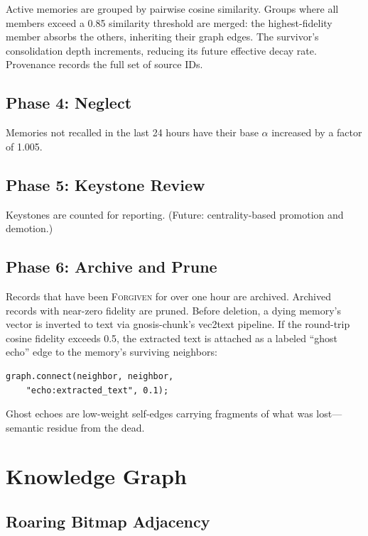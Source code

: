 \documentclass[twocolumn,10pt]{article}
\begin{document}
Active memories are grouped by pairwise cosine similarity.  Groups
where all members exceed a 0.85 similarity threshold are merged: the
highest-fidelity member absorbs the others, inheriting their graph
edges.  The survivor's consolidation depth increments, reducing its
future effective decay rate.  Provenance records the full set of
source IDs.

\subsection{Phase 4: Neglect}

Memories not recalled in the last 24 hours have their base $\alpha$
increased by a factor of 1.005.

\subsection{Phase 5: Keystone Review}

Keystones are counted for reporting.  (Future: centrality-based
promotion and demotion.)

\subsection{Phase 6: Archive and Prune}

Records that have been \textsc{Forgiven} for over one hour are archived.
Archived records with near-zero fidelity are pruned.  Before deletion,
a dying memory's vector is inverted to text via gnosis-chunk's vec2text
pipeline.  If the round-trip cosine fidelity exceeds 0.5, the extracted
text is attached as a labeled ``ghost echo'' edge to the memory's
surviving neighbors:

\begin{lstlisting}
graph.connect(neighbor, neighbor,
    "echo:extracted_text", 0.1);
\end{lstlisting}

\noindent
Ghost echoes are low-weight self-edges carrying fragments of what was
lost---semantic residue from the dead.

\section{Knowledge Graph}

\subsection{Roaring Bitmap Adjacency}
\end{document}
